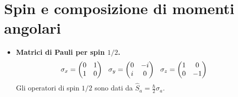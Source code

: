 \documentclass[11pt, a4paper]{scrartcl} %
\numberwithin{equation}{section}
\theoremstyle{style2}
\theoremstyle{style1}
\begin{document}
\section{Spin e composizione di momenti angolari}
\begin{multicols}{2}
	\begin{itemize}
		\item {\sffamily \bfseries Matrici di Pauli per spin $1 / 2$.} 
			\begin{equation*}
				\begin{split}
					&\sigma _x = \begin{pmatrix} 0 & 1 \\ 1 & 0 \end{pmatrix} \hspace{.25cm} \sigma _y = \begin{pmatrix} 0 & - i \\ i & 0 \end{pmatrix} \hspace{.25cm} \sigma _z = \begin{pmatrix} 1 & 0 \\ 0 & -1  \end{pmatrix} 
				\end{split}
			\end{equation*}
			Gli operatori di spin $1 / 2$ sono dati da $\hat{S}_a = \frac{\hbar }{2}\sigma _a$.


\end{itemize}
\end{multicols}
\end{document}
